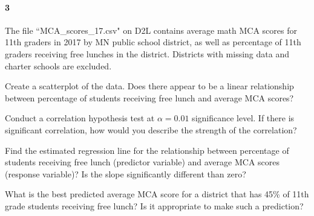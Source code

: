 \documentclass{article}
\begin{document}
\begin{flushleft}
\paragraph{3} The file ``MCA\_scores\_17.csv" on D2L contains average math MCA scores for 11th graders in 2017 by MN public school district, as well as percentage of 11th graders receiving free lunches in the district. Districts with missing data and charter schools are excluded.
\begin{enumalpha}
\item Create a scatterplot of the data. Does there appear to be a linear relationship between percentage of students receiving free lunch and average MCA scores?
\vspace{1.75in}
\item Conduct a correlation hypothesis test at $\alpha = 0.01$ significance level. If there is significant correlation, how would you describe the strength of the correlation?
\vspace{1.75in}
\item Find the estimated regression line for the relationship between percentage of students receiving free lunch (predictor variable) and average MCA scores (response variable)? Is the slope significantly different than zero?
\vspace{1.75in}
\item What is the best predicted average MCA score for a district that has 45\% of 11th grade students receiving free lunch? Is it appropriate to make such a prediction?
\end{enumalpha}



\end{flushleft}
\end{document}
